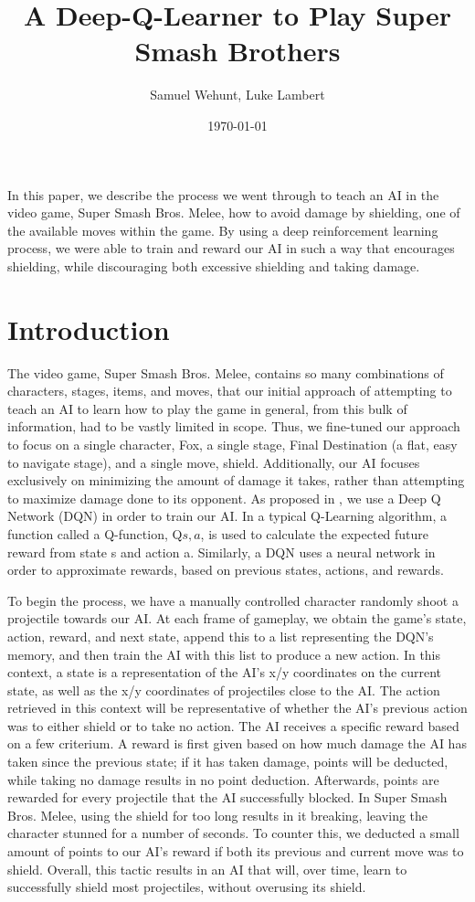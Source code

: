 \documentclass{article}
\date{\today}
\author{Samuel Wehunt, Luke Lambert}
\title{A Deep-Q-Learner to Play Super Smash Brothers}
\begin{document}
\maketitle


In this paper, we describe the process we went through to teach an AI in the video game, Super Smash Bros. Melee, how to avoid damage by shielding, one of the available moves within the game. By using a deep reinforcement learning process, we were able to train and reward our AI in such a way that encourages shielding, while discouraging both excessive shielding and taking damage.  
\section{Introduction}
The video game, Super Smash Bros. Melee, contains so many combinations of characters, stages, items, and moves, that our initial 
approach of attempting to teach an AI to learn how to play the game in general, from this bulk of information, had to be vastly 
limited in scope. Thus, we fine-tuned our approach to focus on a single character, Fox, a single stage, Final Destination (a flat, 
easy to navigate stage), and a single move, shield. Additionally, our AI focuses exclusively on minimizing the amount of damage it 
takes, rather than attempting to maximize damage done to its opponent. As proposed in \cite{atari}, we use a Deep Q Network (DQN) in order to 
train our AI. In a typical Q-Learning algorithm, a function called a Q-function, Q\(s,a\), is used to calculate the expected future reward 
from state s and action a. Similarly, a DQN uses a neural network in order to approximate rewards, based on previous states, actions, and rewards.

To begin the process, we have a manually controlled character randomly shoot a projectile towards our AI. At each frame of gameplay, we obtain 
the game’s state, action, reward, and next state, append this to a list representing the DQN’s memory, and then train the AI with this list to 
produce a new action. In this context, a state is a representation of the AI’s x/y coordinates on the current state, as well as the x/y 
coordinates of projectiles close to the AI. The action retrieved in this context will be representative of whether the AI’s previous action was 
to either shield or to take no action. The AI receives a specific reward based on a few criterium. A reward is first given based on how much 
damage the AI has taken since the previous state; if it has taken damage, points will be deducted, while taking no damage results in no point 
deduction. Afterwards, points are rewarded for every projectile that the AI successfully blocked. In Super Smash Bros. Melee, using the shield 
for too long results in it breaking, leaving the character stunned for a number of seconds. To counter this, we deducted a small amount of points 
to our AI’s reward if both its previous and current move was to shield. Overall, this tactic results in an AI that will, over time, learn to successfully 
shield most projectiles, without overusing its shield.
\end{document}
